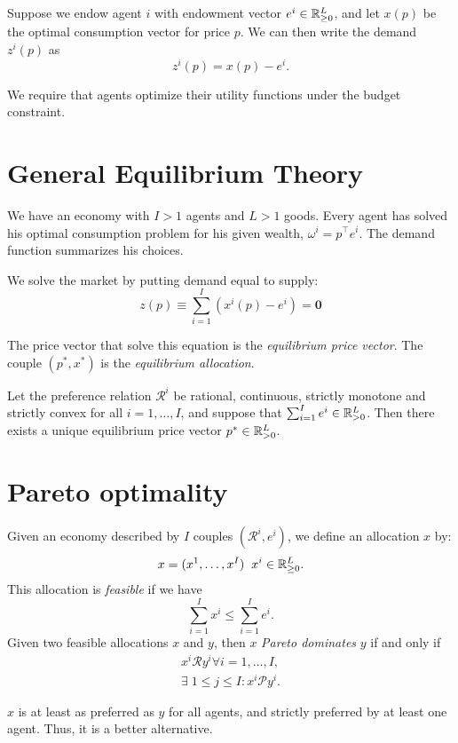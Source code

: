 \documentclass[twoside]{article}
\begin{document}
Suppose we endow agent $i$ with endowment vector $e^i \in \mathbb{R}_{\geq0}^L$, and let $x(p)$ be the optimal consumption vector for price $p$. We can then write the demand $z^i(p)$ as
\[
    z^i(p) = x(p) - e^i.
\]

\begin{definition}
    We require that agents optimize their utility functions under the budget constraint.
\end{definition}

\section{General Equilibrium Theory}
We have an economy with $I>1$ agents and $L>1$ goods. Every agent has solved his optimal consumption problem for his given wealth, $\omega^i = p^\top e^i$. The demand function summarizes his choices.

\begin{definition}
    We solve the market by putting demand equal to supply:
    \[
        z(p) \equiv \sum^I_{i=1}(x^i(p) - e^i) = \mathbf{0}
    \]
\end{definition}
The price vector that solve this equation is the \textit{equilibrium price vector}. The couple $(p^*, x^*)$ is the \textit{equilibrium allocation}.

\begin{theorem}
    Let the preference relation $\mathcal{R}^i$ be rational, continuous, strictly monotone and strictly convex for all $i = 1, \dots, I$, and suppose that $\sum^I_{i=1}e^i \in \mathbb{R}_{>0}^L$. Then there exists a unique equilibrium price vector $p^* \in \mathbb{R}_{>0}^L$.
\end{theorem}


\section{Pareto optimality}
Given an economy described by $I$ couples $(\mathcal{R}^i, e^i)$, we define an allocation $x$ by:
\[
    x = (x^1, \dots, x^I) \;\; x^i \in \mathbb{R}_{\geq0}^L.
\]
This allocation is \textit{feasible} if we have
\[
    \sum^I_{i=1}x^i \leq \sum^I_{i=1}e^i.
\]
Given two feasible allocations $x$ and $y$, then $x$ \textit{Pareto dominates} $y$ if and only if
\begin{align*}
    x^i \mathcal{R} y^i \forall i = 1, \dots, I, \\
    \exists\; 1 \leq j \leq I : x^i \mathcal{P} y^i.
\end{align*}
\begin{explanation}
    $x$ is at least as preferred as $y$ for all agents, and strictly preferred by at least one agent. Thus, it is a better alternative.
\end{explanation}
\end{document}

